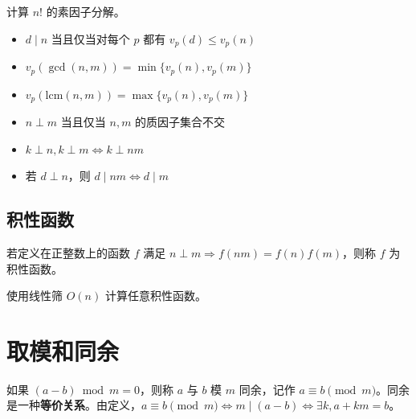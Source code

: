 \begin{exercise}
    计算 $n!$ 的素因子分解。
\end{exercise}



\begin{lemma}[整除与素因子分解]
    \begin{itemize}
        \item $d\mid n$ 当且仅当对每个 $p$ 都有 $v_p(d)\le v_p(n)$
        \item $v_p(\gcd(n,m))=\min\{v_p(n),v_p(m)\}$
        \item $v_p(\mathrm{lcm}(n,m))=\max\{v_p(n),v_p(m)\}$
        \item $n\perp m$ 当且仅当 $n,m$ 的质因子集合不交
        \item $k\perp n, k\perp m\Leftrightarrow k\perp nm$
        \item 若 $d\perp n$，则 $d\mid nm\Longleftrightarrow d\mid m$
    \end{itemize}
\end{lemma}

\subsection{积性函数}

\begin{definition}
    若定义在正整数上的函数 $f$ 满足 $n\perp m\Rightarrow f(nm)=f(n)f(m)$，则称 $f$ 为积性函数。
\end{definition}

\begin{exercise}
    使用线性筛 $O(n)$ 计算任意积性函数。
\end{exercise}

\section{取模和同余}

如果 $(a-b)\bmod m=0$，则称 $a$ 与 $b$ 模 $m$ 同余，记作 $a\equiv b\pmod m$。同余是一种\textbf{等价关系}。由定义，$a\equiv b\pmod m\Longleftrightarrow m\mid (a-b)\Longleftrightarrow \exists k,a+km=b$。

